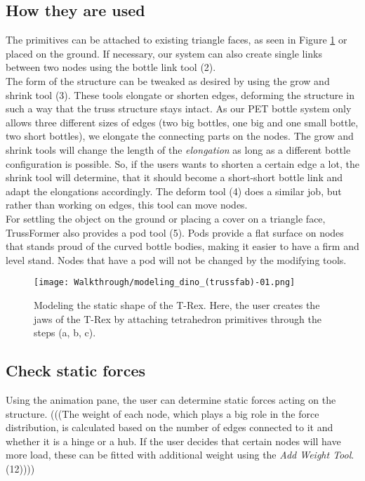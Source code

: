 \subsection{How they are used}
The primitives can be attached to existing triangle faces, as seen in Figure \ref{fig:modelling_t-rex} or placed on the ground. If necessary, our system can also create single links between two nodes using the bottle link tool (2).\\
The form of the structure can be tweaked as desired by using the grow and shrink tool (3). These tools elongate or shorten edges, deforming the structure in such a way that the truss structure stays intact. As our PET bottle system only allows three different sizes of edges (two big bottles, one big and one small bottle, two short bottles), we elongate the connecting parts on the nodes. The grow and shrink tools will change the length of the \textit{elongation} as long as a different bottle configuration is possible. So, if the users wants to shorten a certain edge a lot, the shrink tool will determine, that it should become a short-short bottle link and adapt the elongations accordingly. The deform tool (4) does a similar job, but rather than working on edges, this tool can move nodes.\\
For settling the object on the ground or placing a cover on a triangle face, TrussFormer also provides a pod tool (5). Pods provide a flat surface on nodes that stands proud of the curved bottle bodies, making it easier to have a firm and level stand. Nodes that have a pod will not be changed by the modifying tools.

\begin{figure}[ht!]
    \texttt{[image: Walkthrough/modeling\_dino\_(trussfab)-01.png]}
    \centering
    \caption{Modeling the static shape of the T-Rex. Here, the user creates the jaws of the T-Rex by attaching tetrahedron primitives through the steps (a, b, c).}
    \label{fig:modelling_t-rex}
\end{figure}

\subsection{Check static forces} 
Using the animation pane, the user can determine static forces acting on the structure.
(((The weight of each node, which plays a big role in the force distribution, is calculated based on the number of edges connected to it and whether it is a hinge or a hub. If the user decides that certain nodes will have more load, these can be fitted with additional weight using the \textit{Add Weight Tool}. (12))))

